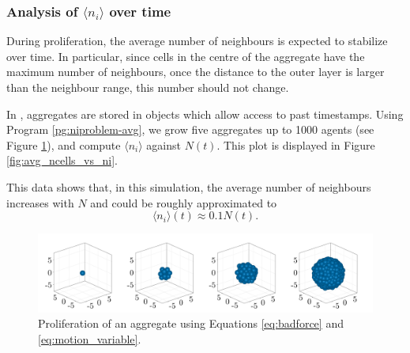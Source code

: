 \subsubsection*{Analysis of $\langle n_i \rangle$ over time}

During proliferation, the average number of neighbours is expected to stabilize over time. In particular, since cells in the centre of the aggregate have the maximum number of neighbours, once the distance to the outer layer is larger than the neighbour range, this number should not change.

In , aggregates are stored in objects which allow access to past timestamps. Using Program \ref{pg:niproblem-avg}, we grow five aggregates up to 1000 agents (see Figure \ref{fig:aggregate_clustered}), and compute $\langle n_i \rangle$ against $N(t)$. This plot is displayed in Figure \ref{fig:avg_ncells_vs_ni}.

This data shows that, in this simulation, the average number of neighbours increases with $N$ and could be roughly approximated to 
\begin{equation}\label{eq:ni_approx}
    \langle n_i \rangle (t)\approx0.1N(t).
\end{equation}

\begin{figure}[ht]
    \centering
    \includegraphics[width=\textwidth]{figures/301/301-aggregate-clustered.png}
    \caption{Proliferation of an aggregate using Equations \ref{eq:badforce} and \ref{eq:motion_variable}.}
    \label{fig:aggregate_clustered}
\end{figure}

